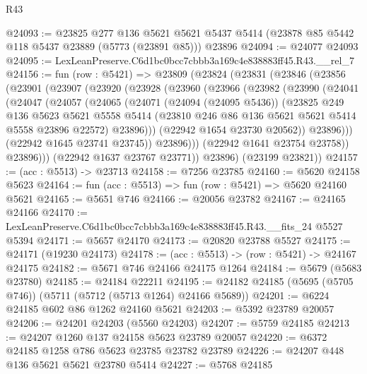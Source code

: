 \begin{lexlean}{R43}
\begin{coremodule}
@24093 := @23825
    @277
    @136
    @5621
    @5621
    @5437
    @5414
    (@23878 @85 @5442 @118 @5437 @23889 (@5773 (@23891 @85)))
    @23896
@24094 := @24077 @24093
@24095 := LexLeanPreserve.C6d1bc0bcc7cbbb3a169c4e838883ff45.R43.__rel_7
@24156 := fun (row : @5421) =>
  @23809
    (@23824
      (@23831
        (@23846
          (@23856
            (@23901
              (@23907
                (@23920
                  (@23928
                    (@23960
                      (@23966
                        (@23982
                          (@23990
                            (@24041
                              (@24047
                                (@24057
                                  (@24065
                                    (@24071
                                      (@24094 (@24095 @5436))
                                      (@23825
                                        @249
                                        @136
                                        @5623
                                        @5621
                                        @5558
                                        @5414
                                        (@23810 @246 @86 @136 @5621 @5621 @5414 @5558 @23896 @22572)
                                        @23896)))
                                  (@22942 @1654 @23730 @20562))
                                @23896)))
                          (@22942 @1645 @23741 @23745))
                        @23896)))
                  (@22942 @1641 @23754 @23758))
                @23896)))
          (@22942 @1637 @23767 @23771))
        @23896)
      (@23199 @23821))
@24157 := (acc : @5513) -> @23713
@24158 := @7256 @23785
@24160 := @5620 @24158 @5623
@24164 := fun (acc : @5513) => fun (row : @5421) => @5620 @24160 @5621
@24165 := @5651 @746
@24166 := @20056 @23782
@24167 := @24165 @24166
@24170 := LexLeanPreserve.C6d1bc0bcc7cbbb3a169c4e838883ff45.R43.__fits_24 @5527 @5394
@24171 := @5657 @24170
@24173 := @20820 @23788 @5527
@24175 := @24171 (@19230 @24173)
@24178 := (acc : @5513) -> (row : @5421) -> @24167 @24175
@24182 := @5671 @746 @24166 @24175 @1264
@24184 := @5679 (@5683 @23780)
@24185 := @24184 @22211
@24195 := @24182 @24185 (@5695 (@5705 @746)) (@5711 (@5712 (@5713 @1264) @24166 @5689))
@24201 := @6224 @24185 @602 @86 @1262 @24160 @5621
@24203 := @5392 @23789 @20057
@24206 := @24201 @24203 (@5560 @24203)
@24207 := @5759 @24185
@24213 := @24207 @1260 @137 @24158 @5623 @23789 @20057
@24220 := @6372 @24185 @1258 @786 @5623 @23785 @23782 @23789
@24226 := @24207 @448 @136 @5621 @5621 @23780 @5414
@24227 := @5768 @24185

\end{coremodule}
\end{lexlean}
